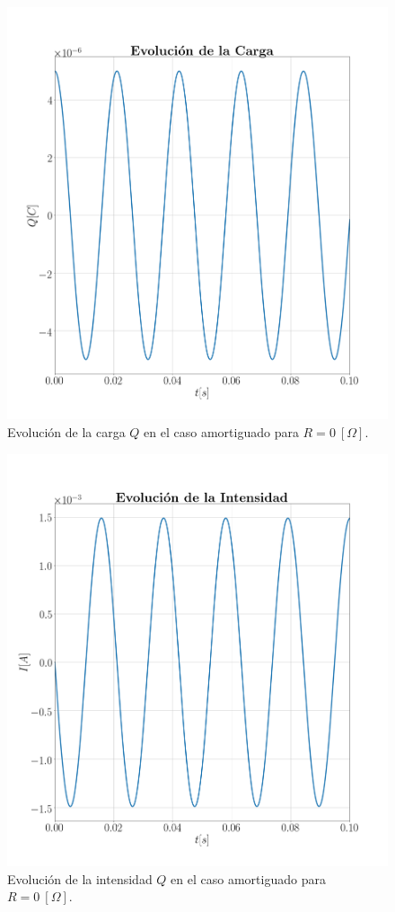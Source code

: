 \documentclass[journal]{IEEEtran}
\begin{document}
\begin{figure}[!htb]
    \centering
    \includegraphics[width=\linewidth,trim={70 70 70 70},clip]{cargaamortiguado.png}
    \caption{Evolución de la carga $Q$ en el caso amortiguado para $R=0~[\Omega]$.}
    \label{fig:cargaamortiguado}
\end{figure}

\begin{figure}[!htb]
    \centering
    \includegraphics[width=\linewidth,trim={40 70 70 70},clip]{intensidadamortiguado.png}
    \caption{Evolución de la intensidad $Q$ en el caso amortiguado para $R=0~[\Omega]$.}
    \label{fig:intensidadamortiguado}
\end{figure}
\end{document}
